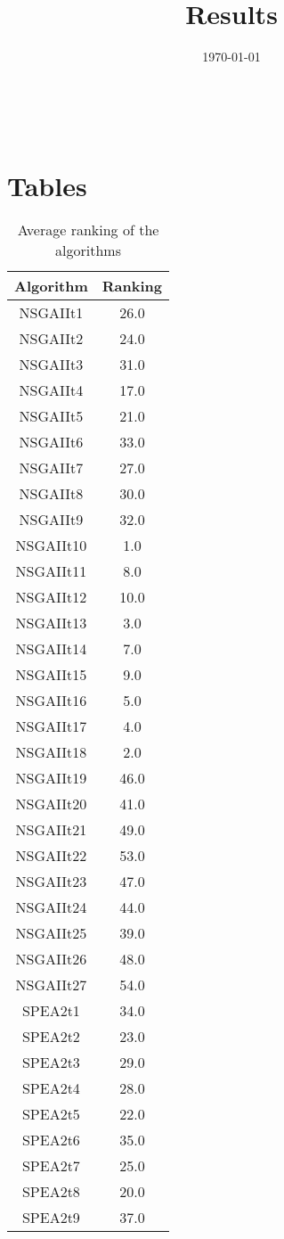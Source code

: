 \documentclass{article}
\title{Results}
\author{}
\date{\today}
\begin{document}
\oddsidemargin 0in \topmargin 0in\maketitle
\
\section{Tables}
\begin{table}[!htp]
\centering
\caption{Average ranking of the algorithms}
\begin{tabular}{c|c}
Algorithm&Ranking\\
\hline
NSGAIIt1&26.0\\
NSGAIIt2&24.0\\
NSGAIIt3&31.0\\
NSGAIIt4&17.0\\
NSGAIIt5&21.0\\
NSGAIIt6&33.0\\
NSGAIIt7&27.0\\
NSGAIIt8&30.0\\
NSGAIIt9&32.0\\
NSGAIIt10&1.0\\
NSGAIIt11&8.0\\
NSGAIIt12&10.0\\
NSGAIIt13&3.0\\
NSGAIIt14&7.0\\
NSGAIIt15&9.0\\
NSGAIIt16&5.0\\
NSGAIIt17&4.0\\
NSGAIIt18&2.0\\
NSGAIIt19&46.0\\
NSGAIIt20&41.0\\
NSGAIIt21&49.0\\
NSGAIIt22&53.0\\
NSGAIIt23&47.0\\
NSGAIIt24&44.0\\
NSGAIIt25&39.0\\
NSGAIIt26&48.0\\
NSGAIIt27&54.0\\
SPEA2t1&34.0\\
SPEA2t2&23.0\\
SPEA2t3&29.0\\
SPEA2t4&28.0\\
SPEA2t5&22.0\\
SPEA2t6&35.0\\
SPEA2t7&25.0\\
SPEA2t8&20.0\\
SPEA2t9&37.0\\

\end{tabular}
\end{table}
\end{document}
